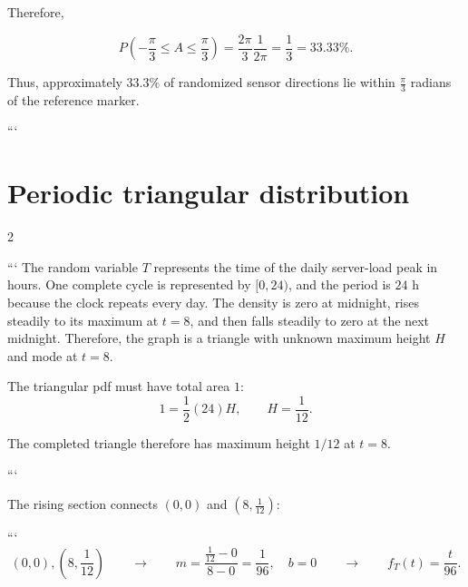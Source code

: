 	Therefore,
	
	$$
	P\left(-\frac{\pi}{3}\le A\le\frac{\pi}{3}\right)
	=
	\frac{2\pi}{3}\frac1{2\pi}
	=
	\frac13
	=
	33.33\%.
	$$
	
	Thus, approximately $33.3\%$ of randomized sensor directions lie within
	$\frac{\pi}{3}$ radians of the reference marker.
	
	```
	
	
	\section{Periodic triangular distribution}
	
	\setlength{\columnseprule}{0.4pt}
	\begin{multicols}{2}
		
		```
		The random variable $T$ represents the time of the daily server-load
		peak in hours. One complete cycle is represented by $[0,24)$, and the
		period is $24$ h because the clock repeats every day. The density is
		zero at midnight, rises steadily to its maximum at $t=8$, and then
		falls steadily to zero at the next midnight. Therefore, the graph is
		a triangle with unknown maximum height $H$ and mode at $t=8$.
		
		
		\columnbreak
		
		The triangular pdf must have total area $1$:
		\[
		1=\frac12(24)H,
		\qquad
		H=\frac1{12}.
		\]
		
		The completed triangle therefore has maximum height $1/12$ at $t=8$.
		
		```
		
	\end{multicols}
	\setlength{\columnseprule}{0pt}
	
	The rising section connects $(0,0)$ and
	$\left(8,\frac1{12}\right)$:
	
	```
	$$
	(0,0),\left(8,\frac1{12}\right)
	\qquad\longrightarrow\qquad
	m=\frac{\frac1{12}-0}{8-0}
	=\frac1{96},
	\quad b=0
	\qquad\longrightarrow\qquad
	f_T(t)=\frac{t}{96}.
	$$
	

